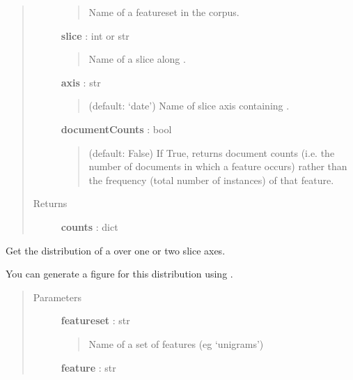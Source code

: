 \documentclass[letterpaper,10pt,english]{sphinxmanual}
\begin{document}
\begin{fulllineitems}
\begin{fulllineitems}
\begin{quote}
\begin{description}
\begin{quote}
Name of a featureset in the corpus.
\end{quote}

\textbf{slice} : int or str
\begin{quote}

Name of a slice along .
\end{quote}

\textbf{axis} : str
\begin{quote}

(default: `date') Name of slice axis containing .
\end{quote}

\textbf{documentCounts} : bool
\begin{quote}

(default: False) If True, returns document counts (i.e. the number
of documents in which a feature occurs) rather than the frequency
(total number of instances) of that feature.
\end{quote}

\item[{Returns}] \leavevmode
\textbf{counts} : dict

\end{description}\end{quote}

\end{fulllineitems}


\begin{fulllineitems}
\label{tethne.classes.corpus:tethne.classes.corpus.Corpus.feature_distribution}
Get the distribution of a  over one or two slice axes.

You can generate a figure for this distribution using
.
\begin{quote}\begin{description}
\item[{Parameters}] \leavevmode
\textbf{featureset} : str
\begin{quote}

Name of a set of features (eg `unigrams')
\end{quote}

\textbf{feature} : str
\begin{quote}


\end{quote}
\end{description}
\end{quote}
\end{fulllineitems}
\end{fulllineitems}
\end{document}
